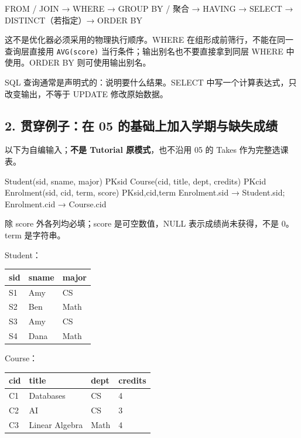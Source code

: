 \begin{StudyCode}
FROM / JOIN → WHERE → GROUP BY / 聚合 → HAVING
            → SELECT → DISTINCT（若指定）→ ORDER BY
\end{StudyCode}

这不是优化器必须采用的物理执行顺序。WHERE 在组形成前筛行，不能在同一查询层直接用 \texttt{AVG(\allowbreak{}score)\allowbreak{}} 当行条件；输出别名也不要直接拿到同层 WHERE 中使用。ORDER BY 则可使用输出别名。

SQL 查询通常是声明式的：说明要什么结果。SELECT 中写一个计算表达式，只改变输出，不等于 UPDATE 修改原始数据。

\subsection{2. 贯穿例子：在 05 的基础上加入学期与缺失成绩}\label{06_sql_queries_zh-ux8d2fux7a7fux4f8bux5b50ux5728-05-ux7684ux57faux7840ux4e0aux52a0ux5165ux5b66ux671fux4e0eux7f3aux5931ux6210ux7ee9}

以下为自编输入；\textbf{不是 Tutorial 原模式}，也不沿用 05 的 Takes 作为完整选课表。

\begin{StudyCode}
Student(sid, sname, major)                 PK{sid}
Course(cid, title, dept, credits)          PK{cid}
Enrolment(sid, cid, term, score)           PK{sid,cid,term}
Enrolment.sid → Student.sid; Enrolment.cid → Course.cid
\end{StudyCode}

除 score 外各列均必填；score 是可空数值，NULL 表示成绩尚未获得，不是 0。term 是字符串。

Student：

\begin{longtable}[]{@{}lll@{}}
\toprule\noalign{}
sid & sname & major \\
\midrule\noalign{}
\endhead
\bottomrule\noalign{}
\endlastfoot
S1 & Amy & CS \\
S2 & Ben & Math \\
S3 & Amy & CS \\
S4 & Dana & Math \\
\end{longtable}

Course：

\begin{longtable}[]{@{}llll@{}}
\toprule\noalign{}
cid & title & dept & credits \\
\midrule\noalign{}
\endhead
\bottomrule\noalign{}
\endlastfoot
C1 & Databases & CS & 4 \\
C2 & AI & CS & 3 \\
C3 & Linear Algebra & Math & 4 \\
\end{longtable}

